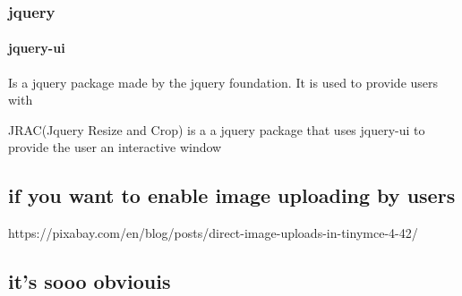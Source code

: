 \subsubsection{jquery}

\paragraph{jquery-ui}

Is a jquery package made by the jquery foundation.  It is used to provide users with 


JRAC(Jquery Resize and Crop) is a a jquery package that uses jquery-ui to provide the user an interactive window 

\subsection{if you want to enable image uploading by users}

https://pixabay.com/en/blog/posts/direct-image-uploads-in-tinymce-4-42/

\subsection{it's sooo obviouis}


